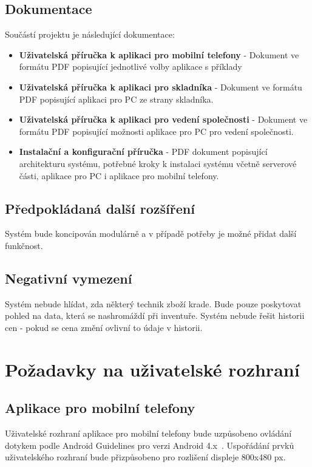 \documentclass[a4paper,10pt]{article}
\begin{document}
\subsection{Dokumentace}
Součástí projektu je následující dokumentace:
\begin{itemize}
	\item \textbf{Uživatelská příručka k aplikaci pro mobilní telefony} - Dokument ve formátu PDF popisující jednotlivé volby aplikace s příklady
	\item \textbf{Uživatelská příručka k aplikaci pro skladníka} - Dokument ve formátu PDF popisující aplikaci pro PC ze strany skladníka. 
	\item \textbf{Uživatelská příručka k aplikaci pro vedení společnosti} - Dokument ve formátu PDF popisující možnosti aplikace pro PC pro vedení společnosti.
	\item \textbf{Instalační a konfigurační příručka} - PDF dokument popisující architekturu systému, potřebné kroky k instalaci systému včetně serverové části, aplikace pro PC i aplikace pro mobilní telefony.
\end{itemize}

\subsection{Předpokládaná další rozšíření}
Systém bude koncipován modulárně a v případě potřeby je možné přidat další funkčnost.

\subsection{Negativní vymezení}
Systém nebude hlídat, zda některý technik zboží krade. Bude pouze poskytovat pohled na data, která se nashromáždí při inventuře. Systém nebude řešit historii cen - pokud se cena změní ovlivní to údaje v historii.

\section{Požadavky na uživatelské rozhraní}
\subsection{Aplikace pro mobilní telefony}
Uživatelské rozhraní aplikace pro mobilní telefony bude uzpůsobeno ovládání dotykem podle Android Guidelines pro verzi Android 4.x~\cite{android_guidelines}. Uspořádání prvků uživatelského rozhraní bude přizpůsobeno pro rozlišení displeje 800x480 px.
\end{document}
